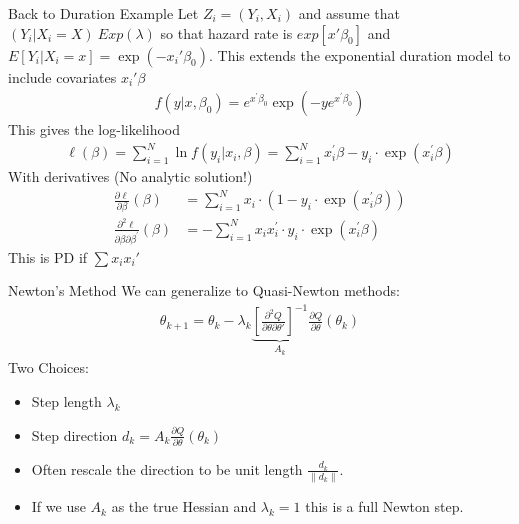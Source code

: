 \documentclass[aspectratio=169]{beamer}
\newcommand{\norm}[1]{\left\lVert#1\right\rVert}
\begin{document}
\begin{frame}{Back to Duration Example}
Let $Z_i = (Y_i,X_i)$ and assume that $(Y_i | X_i = X) ~ Exp(\lambda)$ so that hazard rate is $exp[x'\beta_0]$ and $E[Y_i | X_i=x] = \exp(-x_i'\beta_0)$. This extends the exponential duration model to include covariates $x_i'\beta$
\begin{align*}
f ( y | x , \beta _ { 0 } ) = { e } ^ { x ^ { \prime } \beta _ { 0 } } \exp \left( - y  { e } ^ { x ^ { \prime } \beta _ { 0 } } \right)
\end{align*}
This gives the log-likelihood
\begin{align*}
\ell ( \beta ) = \sum _ { i = 1 } ^ { N } \ln f \left( y _ { i } | x _ { i } , \beta \right) = \sum _ { i = 1 } ^ { N } x _ { i } ^ { \prime } \beta - y _ { i } \cdot \exp \left( x _ { i } ^ { \prime } \beta \right)
\end{align*}
With derivatives (No analytic solution!)
\begin{align*}
\frac { \partial \ell } { \partial \beta } ( \beta ) &= \sum _ { i = 1 } ^ { N } x _ { i } \cdot \left( 1 - y _ { i } \cdot \exp \left( x _ { i } ^ { \prime } \beta \right) \right)\\
\frac { \partial ^ { 2 } \ell } { \partial \beta \partial \beta ^ { \prime } } ( \beta ) &= - \sum _ { i = 1 } ^ { N } x _ { i } x _ { i } ^ { \prime } \cdot y _ { i } \cdot \exp \left( x _ { i } ^ { \prime } \beta \right)
\end{align*}
This is PD if $\sum x_i x_i'$
\end{frame}

\begin{frame}{Newton's Method}
We can generalize to Quasi-Newton methods:
\begin{align*}
\theta_{k+1} = \theta_k -  \lambda_k \underbrace{\left[ \frac{\partial^2 Q}{\partial \theta \partial \theta'} \right]^{-1}}_{A_k} \frac{\partial Q}{\partial \theta}(\theta_k)
\end{align*}
Two Choices:
\begin{itemize}
\item Step length $\lambda_k$
\item Step direction $d_k=A_k \frac{\partial Q}{\partial \theta}(\theta_k)$
\item Often rescale the direction to be unit length $\frac{d_k}{\norm{d_k}}$.
\item If we use $A_k$ as the true Hessian and $\lambda_k=1$ this is a \alert{full Newton step}.
\end{itemize}
\end{frame}
\end{document}
